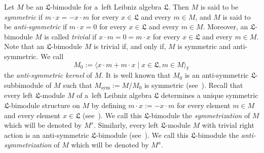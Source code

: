 \documentclass{jonasart}
\DeclareMathOperator{\sym}{sym}
\newcommand{\fbb}{\mathbb{F}}
\newcommand{\lf}{\mathfrak{L}}
\begin{document}
	Let $M$ be an $\lf$-bimodule for a~left Leibniz algebra $\lf$. Then $M$ is said to be \emph{symmetric\/} if $m\cdot x=-x\cdot m$ for every $x\in\lf$ and every
	$m\in M$, and $M$ is said to be \emph{anti-symmetric\/} if $m\cdot x=0$ for every $x\in\lf$ and every $m\in M$. Moreover, an $\lf$-bimodule $M$ is called
	\emph{trivial\/} if $x\cdot m=0=m\cdot x$ for every $x\in\lf$ and every $m\in M$. Note that an $\lf$-bimodule $M$ is trivial if, and only if, $M$ is symmetric and anti-symmetric. We call
	\[
		M_0:=\langle x\cdot m+m\cdot x\mid x\in\lf,m\in M\rangle_\fbb
	\]
	the \emph{anti-symmetric kernel\/} of $M$. It is well known that $M_0$ is an anti-symmetric $\lf$-subbimodule of $M$ such that $M_{\sym}:=M/M_0$ is symmetric (see~\cite[Propositions~3.12 and~3.13]{F1}). Recall that every left $\lf$-module $M$ of a~left Leibniz algebra $\lf$ determines a unique symmetric $\lf$-bimodule structure on $M$ by defining $m\cdot x:=-x\cdot m$ for every element $m\in M$ and every element $x\in\lf$
	(see~\cite[Proposition~3.15\,(b)]{F1}). We call this $\lf$-bimodule the
	\emph{symmetrization\/} of $M$ which will be denoted by $M^s$. Similarly, every left $\lf$-module $M$ with trivial right action is an anti-symmetric
	$\lf$-bimodule (see~\cite[Proposition~3.15\,(a)]{F1}). We call this
	$\lf$-bimodule the \emph{anti-symmetrization\/} of $M$ which will be denoted by $M^a$.
\end{document}
